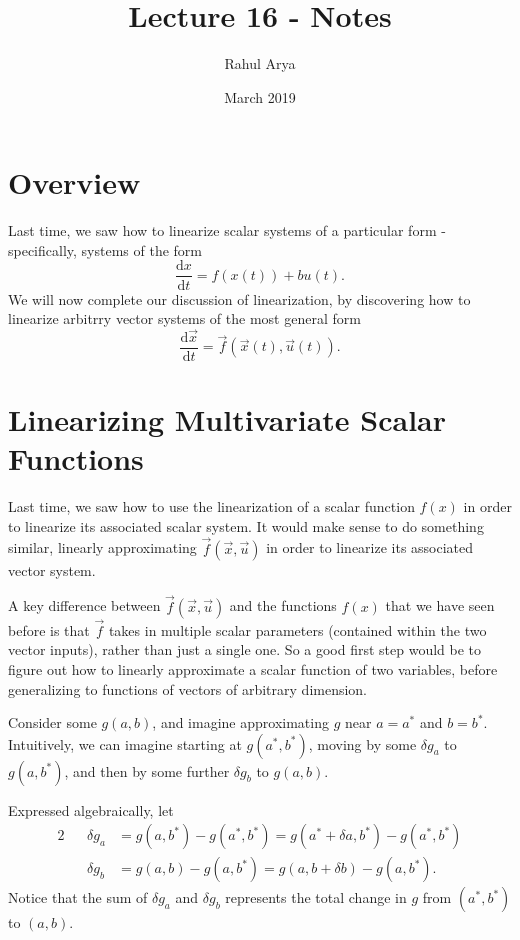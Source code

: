 \documentclass[letterpaper]{article}
\title{Lecture 16 - Notes}
\author{Rahul Arya}
\date{March 2019}
\theoremstyle{remark}
\newcommand{\dx}{\mathrm{d}x}
\newcommand{\dt}{\mathrm{d}t}
\newcommand{\diff}{\mathrm{d}}
\newcommand{\eqn}[1]{\begin{alignat*}{2}#1\end{alignat*}}
\begin{document}
\maketitle

\section{Overview}
Last time, we saw how to linearize scalar systems of a particular form - specifically, systems of the form
\[
    \frac{\dx}{\dt} = f(x(t)) + bu(t).
\]
We will now complete our discussion of linearization, by discovering how to linearize arbitrry vector systems of the most general form
\[
    \frac{\diff \vec{x}}{\dt} = \vec{f}(\vec{x}(t), \vec{u}(t)).
\]

\section{Linearizing Multivariate Scalar Functions}
Last time, we saw how to use the linearization of a scalar function $f(x)$ in order to linearize its associated scalar system. It would make sense to do something similar, linearly approximating $\vec{f}(\vec{x}, \vec{u})$ in order to linearize its associated vector system.

A key difference between $\vec{f}(\vec{x}, \vec{u})$ and the functions $f(x)$ that we have seen before is that $\vec{f}$ takes in multiple scalar parameters (contained within the two vector inputs), rather than just a single one. So a good first step would be to figure out how to linearly approximate a scalar function of two variables, before generalizing to functions of vectors of arbitrary dimension.

Consider some $g(a, b)$, and imagine approximating $g$ near $a = a^*$ and $b = b^*$. Intuitively, we can imagine starting at $g(a^*, b^*)$, moving by some $\delta g_a$ to $g(a, b^*)$, and then by some further $\delta g_b$ to $g(a, b)$. 

Expressed algebraically, let
\eqn{
    && \delta g_a &= g(a, b^*) - g(a^*, b^*) = g(a^* + \delta a, b^*) - g(a^*, b^*) \\
    && \delta g_b &= g(a, b) - g(a, b^*) = g(a, b + \delta b) - g(a, b^*).
}
Notice that the sum of $\delta g_a$ and $\delta g_b$ represents the total change in $g$ from $(a^*, b^*)$ to $(a, b)$.
\end{document}
